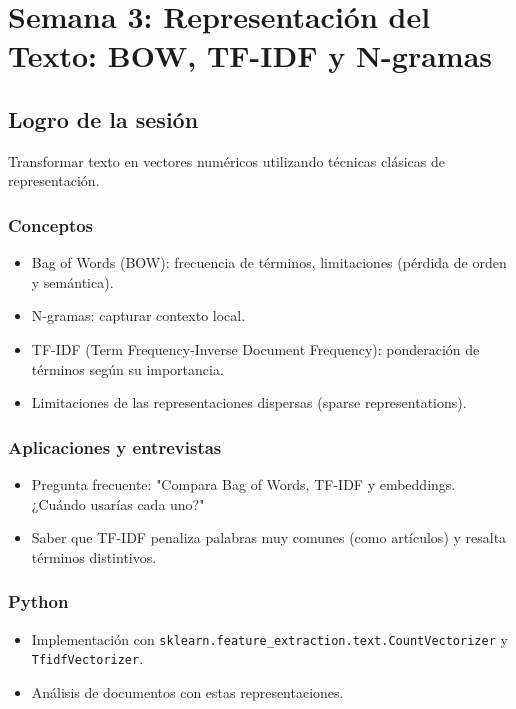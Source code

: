 \documentclass[12pt,a4paper,openany,oneside]{book}
\begin{document}
\chapter{Semana 3: Representación del Texto: BOW, TF-IDF y N-gramas}

\section{Logro de la sesión}
Transformar texto en vectores numéricos utilizando técnicas clásicas de representación.

\subsection{Conceptos}
\begin{itemize}
    \item Bag of Words (BOW): frecuencia de términos, limitaciones (pérdida de orden y semántica).
    \item N-gramas: capturar contexto local.
    \item TF-IDF (Term Frequency-Inverse Document Frequency): ponderación de términos según su importancia.
    \item Limitaciones de las representaciones dispersas (sparse representations).
\end{itemize}

\subsection{Aplicaciones y entrevistas}
\begin{itemize}
    \item Pregunta frecuente: "Compara Bag of Words, TF-IDF y embeddings. ¿Cuándo usarías cada uno?"
    \item Saber que TF-IDF penaliza palabras muy comunes (como artículos) y resalta términos distintivos.
\end{itemize}

\subsection{Python}
\begin{itemize}
    \item Implementación con \texttt{sklearn.feature\_extraction.text.CountVectorizer} y \texttt{TfidfVectorizer}.
    \item Análisis de documentos con estas representaciones.
\end{itemize}
\end{document}

